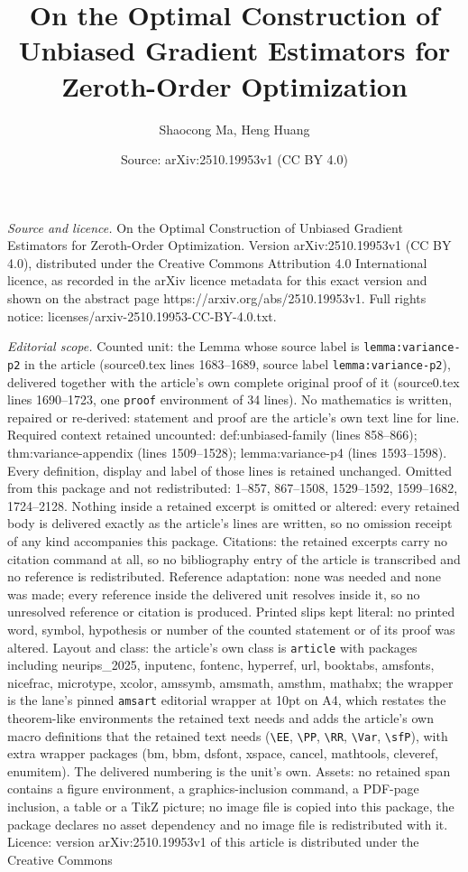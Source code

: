 \documentclass[10pt,a4paper]{amsart}
\title[On the Optimal Construction of Unbiased Gradient Estimators ]{On the Optimal Construction of Unbiased Gradient Estimators for Zeroth-Order Optimization}
\author{Shaocong Ma, Heng Huang}
\date{Source: arXiv:2510.19953v1 (CC BY 4.0)}
\begin{document}
\maketitle

\noindent\emph{Source and licence.} On the Optimal Construction of Unbiased Gradient Estimators for Zeroth-Order Optimization. Version arXiv:2510.19953v1 (CC BY 4.0), distributed under the Creative Commons Attribution 4.0 International licence, as recorded in the arXiv licence metadata for this exact version and shown on the abstract page https://arxiv.org/abs/2510.19953v1. Full rights notice: licenses/arxiv-2510.19953-CC-BY-4.0.txt.\par\smallskip

\noindent\textit{Editorial scope.} Counted unit: the Lemma whose source label is \texttt{lemma:variance-p2} in the article (source0.tex lines 1683--1689, source label \texttt{lemma:variance-p2}), delivered together with the article's own complete original proof of it (source0.tex lines 1690--1723, one \texttt{proof} environment of 34 lines). No mathematics is written, repaired or re-derived: statement and proof are the article's own text line for line. Required context retained uncounted: def:unbiased-family (lines 858--866); thm:variance-appendix (lines 1509--1528); lemma:variance-p4 (lines 1593--1598). Every definition, display and label of those lines is retained unchanged. Omitted from this package and not redistributed: 1--857, 867--1508, 1529--1592, 1599--1682, 1724--2128. Nothing inside a retained excerpt is omitted or altered: every retained body is delivered exactly as the article's lines are written, so no omission receipt of any kind accompanies this package. Citations: the retained excerpts carry no citation command at all, so no bibliography entry of the article is transcribed and no reference is redistributed. Reference adaptation: none was needed and none was made; every reference inside the delivered unit resolves inside it, so no unresolved reference or citation is produced. Printed slips kept literal: no printed word, symbol, hypothesis or number of the counted statement or of its proof was altered. Layout and class: the article's own class is \texttt{article} with packages including neurips\_2025, inputenc, fontenc, hyperref, url, booktabs, amsfonts, nicefrac, microtype, xcolor, amssymb, amsmath, amsthm, mathabx; the wrapper is the lane's pinned \texttt{amsart} editorial wrapper at 10pt on A4, which restates the theorem-like environments the retained text needs and adds the article's own macro definitions that the retained text needs (\texttt{\textbackslash EE}, \texttt{\textbackslash PP}, \texttt{\textbackslash RR}, \texttt{\textbackslash Var}, \texttt{\textbackslash sfP}), with extra wrapper packages (bm, bbm, dsfont, xspace, cancel, mathtools, cleveref, enumitem). The delivered numbering is the unit's own. Assets: no retained span contains a figure environment, a graphics-inclusion command, a PDF-page inclusion, a table or a TikZ picture; no image file is copied into this package, the package declares no asset dependency and no image file is redistributed with it. Licence: version arXiv:2510.19953v1 of this article is distributed under the Creative Commons 
\end{document}
